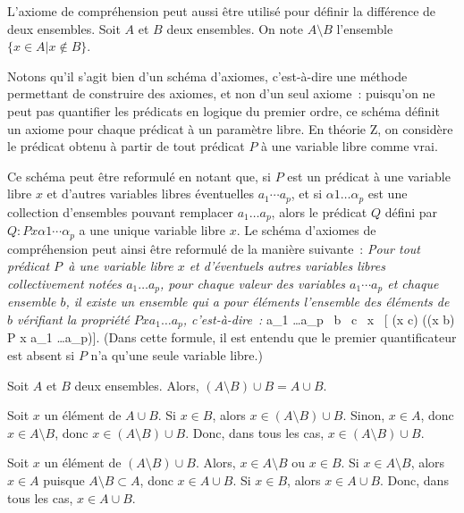 \blank[medium]

L'axiome de compréhension peut aussi être utilisé pour définir la différence de deux ensembles. 
Soit $A$ et $B$ deux ensembles. 
On note $A \setminus B$ l'ensemble $\lbrace x \in A \vert x \notin B \rbrace$.

\blank[medium]

Notons qu'il s'agit bien d'un schéma d'axiomes, c'est-à-dire une méthode permettant de construire des axiomes, et non d'un seul axiome : puisqu'on ne peut pas quantifier les prédicats en logique du premier ordre, ce schéma définit un axiome pour chaque prédicat à un paramètre libre. 
En théorie Z, on considère le prédicat obtenu à partir de tout prédicat $P$ à une variable libre comme vrai.

Ce schéma peut être reformulé en notant que, si $P$ est un prédicat à une variable libre $x$ et d'autres variables libres éventuelles $a_1 \cdots a_p$, et si $\alpha 1 \dots \alpha_p$ est une collection d'ensembles pouvant remplacer $a_1 \dots a_p$, alors le prédicat $Q$ défini par $Q: P x \alpha1 \cdots \alpha_p$ a une unique variable libre $x$. 
Le schéma d'axiomes de compréhension peut ainsi être reformulé de la manière suivante : 
\emph{Pour tout prédicat $P$ à une variable libre $x$ et d'éventuels autres variables libres collectivement notées $a_1 \dots a_p$, pour chaque valeur des variables $a_1 \cdots a_p$ et chaque ensemble $b$, il existe un ensemble qui a pour éléments l'ensemble des éléments de $b$ vérifiant la propriété $P x a_1 \dots a_p$, c'est-à-dire :}
\startformula
\forall a_1 \dots a_p \, \forall b \, \exists c \, \forall x \, [ (x \in c) \Leftrightarrow ((x \in b) \wedge P x a_1 \dots a_p)]. 
\stopformula
(Dans cette formule, il est entendu que le premier quantificateur est absent si $P$ n'a qu'une seule variable libre.) 

\blank[medium]

\noindent{} Soit $A$ et $B$ deux ensembles.
    Alors, $(A \setminus B) \cup B = A \cup B$.

\blank[medium]

\noindent{}
    Soit $x$ un élément de $A \cup B$. 
    Si $x \in B$, alors $x \in (A \setminus B) \cup B$.
    Sinon, $x \in A$, donc $x \in A \setminus B$, donc $x \in (A \setminus B) \cup B$.
    Donc, dans tous les cas, $x \in (A \setminus B) \cup B$.

    Soit $x$ un élément de $(A \setminus B) \cup B$.
    Alors, $x \in A \setminus B$ ou $x \in B$. 
    Si $x \in A \setminus B$, alors $x \in A$ puisque $A \setminus B \subset A$, donc $x \in A \cup B$.
    Si $x \in B$, alors $x \in A \cup B$.
    Donc, dans tous les cas, $x \in A \cup B$.

